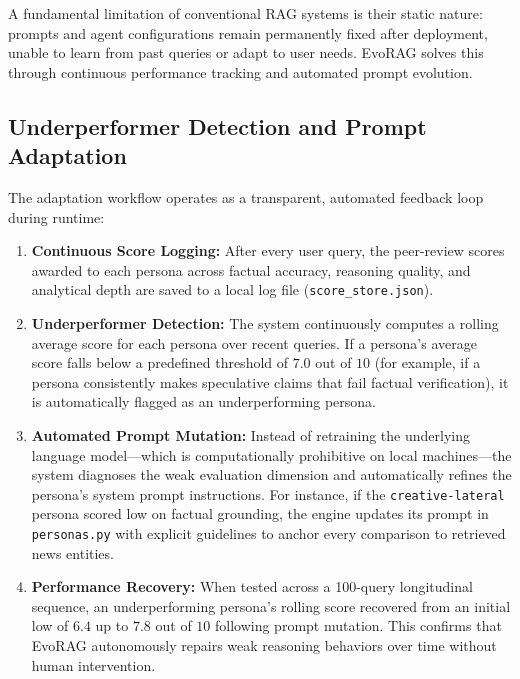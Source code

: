 A fundamental limitation of conventional RAG systems is their static nature: prompts and agent configurations remain permanently fixed after deployment, unable to learn from past queries or adapt to user needs. EvoRAG solves this through continuous performance tracking and automated prompt evolution.

\subsection{Underperformer Detection and Prompt Adaptation}
The adaptation workflow operates as a transparent, automated feedback loop during runtime:
\begin{enumerate}
    \item \textbf{Continuous Score Logging:} After every user query, the peer-review scores awarded to each persona across factual accuracy, reasoning quality, and analytical depth are saved to a local log file (\texttt{score\_store.json}).
    \item \textbf{Underperformer Detection:} The system continuously computes a rolling average score for each persona over recent queries. If a persona's average score falls below a predefined threshold of $7.0$ out of $10$ (for example, if a persona consistently makes speculative claims that fail factual verification), it is automatically flagged as an underperforming persona.
    \item \textbf{Automated Prompt Mutation:} Instead of retraining the underlying language model—which is computationally prohibitive on local machines—the system diagnoses the weak evaluation dimension and automatically refines the persona's system prompt instructions. For instance, if the \texttt{creative-lateral} persona scored low on factual grounding, the engine updates its prompt in \texttt{personas.py} with explicit guidelines to anchor every comparison to retrieved news entities.
    \item \textbf{Performance Recovery:} When tested across a 100-query longitudinal sequence, an underperforming persona's rolling score recovered from an initial low of $6.4$ up to $7.8$ out of $10$ following prompt mutation. This confirms that EvoRAG autonomously repairs weak reasoning behaviors over time without human intervention.
\end{enumerate}


